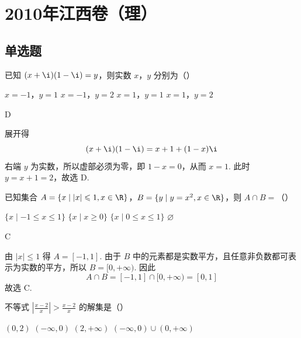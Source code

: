 \chapter{2010年江西卷（理）}

\section{单选题}

\begin{problem}
已知 \((x + \i) (1 - \i) = y\)，则实数 \(x\)，\(y\) 分别为（\quad）

\choices
    {\(x = -1\)，\(y = 1\)}
    {\(x = -1\)，\(y = 2\)}
    {\(x = 1\)，\(y = 1\)}
    {\(x = 1\)，\(y = 2\)}
\end{problem}

\begin{answer}
D
\end{answer}

\begin{solution}
展开得
\[
(x+\i)(1-\i)=x+1+(1-x)\i
\]
右端 \(y\) 为实数，所以虚部必须为零，即 \(1-x=0\)，从而 \(x=1\). 此时 \(y=x+1=2\)，故选 D.
\end{solution}

\begin{problem}
已知集合 \(A = \{x \mid |x| \leqslant 1, x \in \R\}\)，\(B = \{y \mid y = x^2, x \in \R\}\)，则 \(A \cap B =\)（\quad）

\choices
    {\(\{x \mid -1 \leqslant x \leqslant 1\}\)}
    {\(\{x \mid x \geqslant 0\}\)}
    {\(\{x \mid 0 \leqslant x \leqslant 1\}\)}
    {\(\varnothing\)}
\end{problem}

\begin{answer}
C
\end{answer}

\begin{solution}
由 \(|x|\leqslant1\) 得 \(A=[-1,1]\). 由于 \(B\) 中的元素都是实数平方，且任意非负数都可表示为实数的平方，所以 \(B=[0,+\infty)\). 因此
\[
A\cap B=[-1,1]\cap[0,+\infty)=[0,1]
\]
故选 C.
\end{solution}

\begin{problem}
不等式 \(\left|\frac{x - 2}{x}\right| > \frac{x - 2}{x}\) 的解集是（\quad）

\choices
    {\((0, 2)\)}
    {\((-\infty, 0)\)}
    {\((2, +\infty)\)}
    {\((-\infty, 0) \cup (0, +\infty)\)}
\end{problem}

